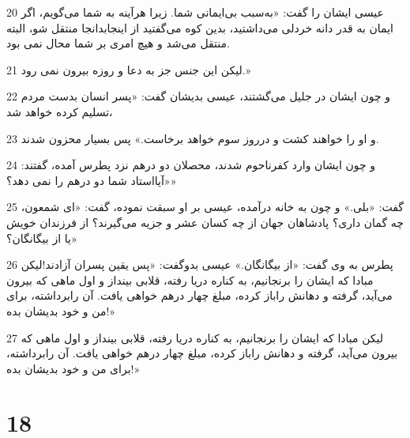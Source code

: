 \par 20 عیسی ایشان را گفت: «به‌سبب بی‌ایمانی شما. زیرا هرآینه به شما می‌گویم، اگر ایمان به قدر دانه خردلی می‌داشتید، بدین کوه می‌گفتید از اینجابدانجا منتقل شو، البته منتقل می‌شد و هیچ امری بر شما محال نمی بود.
\par 21 لیکن این جنس جز به دعا و روزه بیرون نمی رود.»
\par 22 و چون ایشان در جلیل می‌گشتند، عیسی بدیشان گفت: «پسر انسان بدست مردم تسلیم کرده خواهد شد،
\par 23 و او را خواهند کشت و درروز سوم خواهد برخاست.» پس بسیار محزون شدند.
\par 24 و چون ایشان وارد کفرناحوم شدند، محصلان دو درهم نزد پطرس آمده، گفتند: «آیااستاد شما دو درهم را نمی دهد؟»
\par 25 گفت: «بلی.» و چون به خانه درآمده، عیسی بر او سبقت نموده، گفت: «ای شمعون، چه گمان داری؟ پادشاهان جهان از چه کسان عشر و جزیه می‌گیرند؟ از فرزندان خویش یا از بیگانگان؟»
\par 26 پطرس به وی گفت: «از بیگانگان.» عیسی بدوگفت: «پس یقین پسران آزادند!لیکن مبادا که ایشان را برنجانیم، به کناره دریا رفته، قلابی بینداز و اول ماهی که بیرون می‌آید، گرفته و دهانش راباز کرده، مبلغ چهار درهم خواهی یافت. آن رابرداشته، برای من و خود بدیشان بده!»
\par 27 لیکن مبادا که ایشان را برنجانیم، به کناره دریا رفته، قلابی بینداز و اول ماهی که بیرون می‌آید، گرفته و دهانش راباز کرده، مبلغ چهار درهم خواهی یافت. آن رابرداشته، برای من و خود بدیشان بده!»

\chapter{18}

